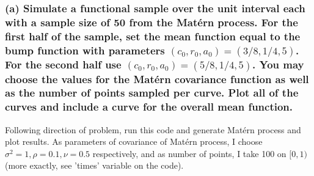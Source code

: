 \documentclass{article}
\begin{document}
\subsubsection*{(a) Simulate a functional sample over the unit interval each with a sample size of 50 from the Mat\'{e}rn process. 
For the first half of the sample, set the mean function equal to the bump function with parameters $(c_0,r_0,a_0)=(3/8,1/4,5)$.
For the second half use $(c_0,r_0,a_0)=(5/8,1/4,5)$.
You may choose the values for the Mat\'{e}rn covariance function as well as the number of points sampled per curve.
Plot all of the curves and include a curve for the overall mean function.}

Following direction of problem, run this code and generate Mat\'{e}rn process and plot results.
As parameters of covariance of Mat\'{e}rn process, I choose $\sigma^2=1, \rho=0.1, \nu=0.5$ respectively,
and as number of points, I take 100 on $[0,1)$ (more exactly, see 'times' variable on the code).
\end{document}
